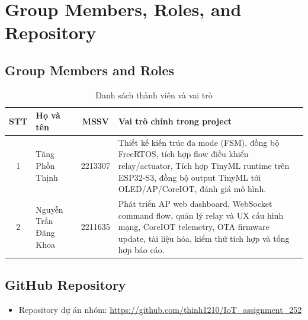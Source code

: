 \section{Group Members, Roles, and Repository}

\subsection{Group Members and Roles}
\begin{table}[H]
\centering
\begin{tabular}{|c|p{4.1cm}|c|p{6.8cm}|}
\hline
\textbf{STT} & \textbf{Họ và tên} & \textbf{MSSV} & \textbf{Vai trò chính trong project} \\
\hline
1 & Tăng Phồn Thịnh & 2213307 & Thiết kế kiến trúc đa mode (FSM), đồng bộ FreeRTOS, tích hợp flow điều khiển relay/actuator, Tích hợp TinyML runtime trên ESP32-S3, đồng bộ output TinyML tới OLED/AP/CoreIOT, đánh giá mô hình. \\
\hline

2 & Nguyễn Trần Đăng Khoa & 2211635 & Phát triển AP web dashboard, WebSocket command flow, quản lý relay và UX cấu hình mạng, CoreIOT telemetry, OTA firmware update, tài liệu hóa, kiểm thử tích hợp và tổng hợp báo cáo. \\

\hline
\end{tabular}
\caption{Danh sách thành viên và vai trò}
\label{tab:members-roles}
\end{table}

\subsection{GitHub Repository}
\begin{itemize}
    \item Repository dự án nhóm: \url{https://github.com/thinh1210/IoT_assignment_252}
\end{itemize}

